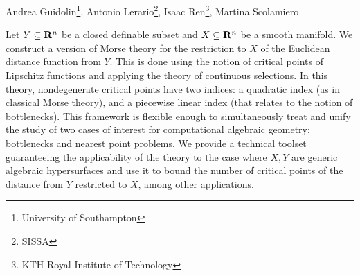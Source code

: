 

\newrefsection

\setcounter{footnotevalue}{\value{footnote}}
\setcounter{footnote}{0}
\renewcommand*{\thefootnote}{\roman{footnote}}
{\sffamily
  Andrea Guidolin\footnote{University of Southampton},
  Antonio Lerario\footnote{SISSA},
  Isaac Ren\footnote{KTH Royal Institute of Technology},
  Martina Scolamiero\addtocounter{footnote}{-1}\footnotemark
}
\setcounter{footnote}{\value{footnotevalue}}
\renewcommand*{\thefootnote}{\arabic{footnote}}

\begin{paperabstract}
  Let $Y\subseteq \mathbf{R}^n$ be a closed definable subset and $X\subseteq \mathbf{R}^n$ be a smooth manifold. We construct a version of Morse theory for the restriction to $X$ of the Euclidean distance function from $Y$. This is done using the notion of critical points of Lipschitz functions and applying the theory of continuous selections. In this theory, nondegenerate critical points have two indices: a quadratic index (as in classical Morse theory), and a piecewise linear index (that relates to the notion of bottlenecks).
  This framework is flexible enough to simultaneously treat and unify the study of two cases of interest for computational algebraic geometry: bottlenecks and nearest point problems.
  We provide a technical toolset guaranteeing the applicability of the theory to the case where $X, Y$ are generic algebraic hypersurfaces and use it to bound the number of critical points of the distance from $Y$ restricted to $X$, among other applications.
\end{paperabstract}

